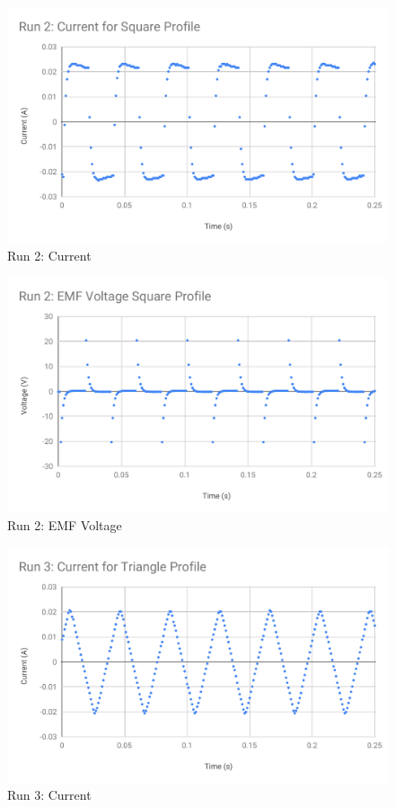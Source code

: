 %
\begin{figure}[ht]
	\centering
	\includegraphics[scale=0.74]{image/04-faraday/run-2-I.pdf}
	\caption{Run 2: Current}
	\label{figure.04.run.2.I}
\end{figure}
%
\begin{figure}[ht]
	\centering
	\includegraphics[scale=0.74]{image/04-faraday/run-2-V.pdf}
	\caption{Run 2: EMF Voltage}
	\label{figure.04.run.2.V}
\end{figure}
%
\begin{figure}[ht]
	\centering
	\includegraphics[scale=0.74]{image/04-faraday/run-3-I.pdf}
	\caption{Run 3: Current}
	\label{figure.04.run.3.I}
\end{figure}
